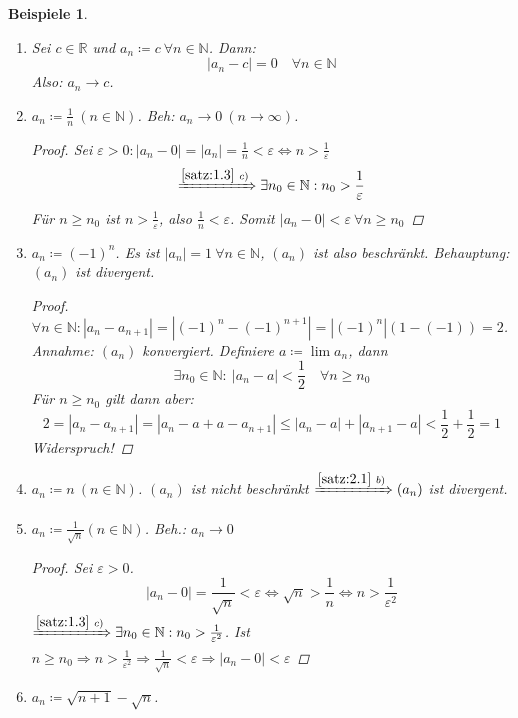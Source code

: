 \documentclass[titlepage,ngerman,a4paper,headsepline,DIV15,halfparskip*,14pt]{scrartcl}
\newcommand{\R}{\mathbb{R}}
\newcommand{\N}{\mathbb{N}}
\theoremstyle{dotless}
\newtheorem*{beispiele}{Beispiele}
\begin{document}
\begin{beispiele}\
	\begin{enumerate}
		\item Sei $c \in \R$ und $a_{n} \coloneqq c ~\forall n \in \N$. Dann:
			$$
				| a_{n} - c | = 0 \quad \forall n \in \N
			$$
			Also: $a_{n} \rightarrow c$.
		\item $a_{n} \coloneqq \frac{1}{n} ~(n \in \N)$. Beh: $a_{n} \rightarrow 0 ~(n \rightarrow \infty)$.
			\begin{proof}
				Sei $\varepsilon > 0: |a_{n} - 0 | = |a_{n}| = \frac{1}{n} < \varepsilon \iff n > \frac{1}{\varepsilon}$
				$$
						\xRightarrow[]{\ref{satz:1.3}~c)} \exists n_{0} \in \N: n_{0} > \frac{1}{\varepsilon}
				$$
				Für $n \geq n_{0}$ ist $n > \frac{1}{\varepsilon}$, also $\frac{1}{n} < \varepsilon$. Somit $|a_{n} - 0| < \varepsilon ~\forall n \geq n_{0}$
			\end{proof}
		\item $a_{n} \coloneqq (-1)^{n}$. Es ist $|a_{n}| = 1 ~\forall n \in \N$, $(a_{n})$ ist also beschränkt. Behauptung: $(a_{n})$ ist divergent.
			\begin{proof}
				$\forall n \in \N: |a_{n} - a_{n+1}| = |(-1)^{n} - (-1)^{n+1}| = |(-1)^{n}| \left( 1 - (-1) \right) = 2$. \\
				Annahme: $(a_{n})$ konvergiert. Definiere $a \coloneqq \lim a_{n}$, dann 
				$$
					 \exists n_{0} \in \N: ~ |a_{n} - a| < \frac{1}{2} \quad \forall n \geq n_{0}
				$$
				Für $n \geq n_{0}$ gilt dann aber:
				$$
					2 = |a_{n} - a_{n+1}| = |a_{n} - a + a - a_{n + 1}| \leq |a_{n} - a| + |a_{n+1} - a| < \frac{1}{2} + \frac{1}{2} = 1
				$$
				Widerspruch!
			\end{proof}
		\item $a_{n} \coloneqq n ~(n \in \N)$. $(a_{n})$ ist nicht beschränkt $\xRightarrow[]{\ref{satz:2.1}~b)} (a_{n})$ ist divergent.
		\item $a_{n} \coloneqq  \frac{1}{\sqrt{n}} (n \in \N)$. Beh.: $a_{n} \rightarrow 0$
			\begin{proof}
				Sei $\varepsilon > 0$.
				$$
					|a_{n} - 0| = \frac{1}{\sqrt{n}} < \varepsilon \iff \sqrt{n} > \frac{1}{n} \iff n > \frac{1}{\varepsilon^{2}}
				$$
				$\xRightarrow[]{\ref{satz:1.3}~c)} \exists n_{0} \in \N: n_{0} > \frac{1}{\varepsilon^{2}}$. Ist $n \geq n_{0} \Rightarrow n > \frac{1}{\varepsilon^{2}} \Rightarrow \frac{1}{\sqrt{n}} < \varepsilon \Rightarrow |a_{n} - 0 | < \varepsilon$ 
			\end{proof}
		\item $a_{n} \coloneqq \sqrt{n + 1} - \sqrt{n}$. 

\end{enumerate}
\end{beispiele}
\end{document}
